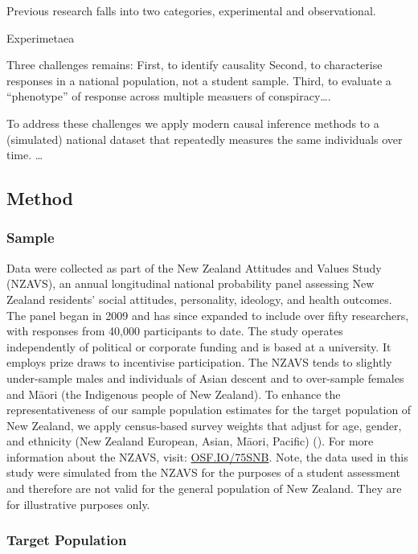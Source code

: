\documentclass[
  single column]{article}
\begin{document}
Previous research falls into two categories, experimental and
observational.

Experimetaea

Three challenges remains: First, to identify causality Second, to
characterise responses in a national population, not a student sample.
Third, to evaluate a ``phenotype'' of response across multiple measuers
of conspiracy\ldots.

To address these challenges we apply modern causal inference methods to
a (simulated) national dataset that repeatedly measures the same
individuals over time. \ldots{}

\subsection{Method}\label{method}

\subsubsection{Sample}\label{sample}

Data were collected as part of the New Zealand Attitudes and Values
Study (NZAVS), an annual longitudinal national probability panel
assessing New Zealand residents' social attitudes, personality,
ideology, and health outcomes. The panel began in 2009 and has since
expanded to include over fifty researchers, with responses from 40,000
participants to date. The study operates independently of political or
corporate funding and is based at a university. It employs prize draws
to incentivise participation. The NZAVS tends to slightly under-sample
males and individuals of Asian descent and to over-sample females and
Māori (the Indigenous people of New Zealand). To enhance the
representativeness of our sample population estimates for the target
population of New Zealand, we apply census-based survey weights that
adjust for age, gender, and ethnicity (New Zealand European, Asian,
Māori, Pacific) (). For more
information about the NZAVS, visit:
\href{https://doi.org/10.17605/OSF.IO/75SNB}{OSF.IO/75SNB}. Note, the
data used in this study were simulated from the NZAVS for the purposes
of a student assessment and therefore are not valid for the general
population of New Zealand. They are for illustrative purposes only.

\subsubsection{Target Population}\label{target-population}
\end{document}

